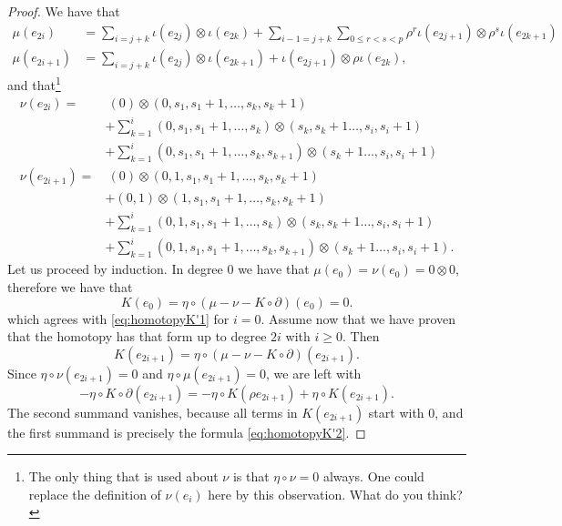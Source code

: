 \begin{proof}
	We have that
	\begin{align*}
		\mu(e_{2i}) &= \sum_{i=j+k} \iota(e_{2j})\otimes \iota(e_{2k}) + \sum_{i-1=j+k}\sum_{0\leq r<s<p} \rho^r\iota(e_{2j+1})\otimes \rho^s\iota(e_{2k+1}) \\
		\mu(e_{2i+1}) &= \sum_{i=j+k} \iota(e_{2j})\otimes \iota(e_{2k+1}) + \iota(e_{2j+1})\otimes \rho \iota(e_{2k}),
	\end{align*}
	and that\footnote{The only thing that is used about $\nu$ is that $\eta\circ \nu = 0$ always. One could replace the definition of $\nu(e_i)$ here by this observation. What do you think?}
	\begin{align*}
		\nu(e_{2i}) =&\  (0)\otimes(0,s_1,s_1+1,\ldots,s_k,s_k+1) \\
		&+ \sum_{k=1}^i(0,s_1,s_1+1,\ldots,s_k)\otimes(s_k,s_k+1\ldots,s_i,s_i+1) \\
		&+ \sum_{k=1}^i(0,s_1,s_1+1,\ldots,s_k,s_{k+1})\otimes(s_k+1\ldots,s_i,s_i+1) \\
		\nu(e_{2i+1}) =&\ (0)\otimes(0,1,s_1,s_1+1,\ldots,s_k,s_k+1) \\
		&+ (0,1)\otimes(1,s_1,s_1+1,\ldots,s_k,s_k+1) \\
		&+ \sum_{k=1}^i(0,1,s_1,s_1+1,\ldots,s_k)\otimes(s_k,s_k+1\ldots,s_i,s_i+1) \\
		&+ \sum_{k=1}^i(0,1,s_1,s_1+1,\ldots,s_k,s_{k+1})\otimes(s_k+1\ldots,s_i,s_i+1).
	\end{align*}
	Let us proceed by induction. In degree $0$ we have that $\mu(e_0) = \nu(e_0) = 0\otimes 0$, therefore we have that
	\[K(e_0) = \eta\circ (\mu-\nu-K\circ\partial)(e_0) = 0.\]
	which agrees with \eqref{eq:homotopyK'1} for $i=0$. Assume now that we have proven that the homotopy has that form up to degree $2i$ with $i\geq 0$. Then
	\[K(e_{2i+1}) = \eta\circ (\mu-\nu-K\circ\partial)(e_{2i+1}).\]
	Since $\eta\circ \nu(e_{2i+1}) = 0$ and $\eta\circ\mu(e_{2i+1}) = 0$, we are left with
	\[-\eta\circ K\circ\partial(e_{2i+1}) = -\eta\circ K (\rho e_{2i+1}) + \eta\circ K (e_{2i+1}).
	\]
	The second summand vanishes, because all terms in $K(e_{2i+1})$ start with $0$, and the first summand is precisely the formula \eqref{eq:homotopyK'2}.


\end{proof}
